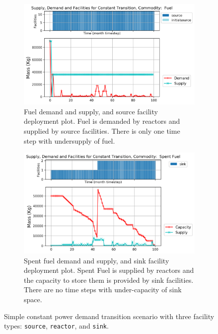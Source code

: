     \begin{figure}[]
        \centering
        \begin{subfigure}[t]{1\textwidth}
            \centering
            \includegraphics[width=0.8\linewidth]{figures/constanttransition-fuel.png} 
            \caption{Fuel demand and supply, and source facility deployment plot.
            Fuel is demanded by reactors and supplied by source facilities.
            There is only one time step with undersupply of fuel.}
            \label{fig:constanttransition-fuel}
        \end{subfigure}
        \begin{subfigure}[t]{1\textwidth}
            \centering
            \includegraphics[width=0.8\linewidth]{figures/constanttransition-spentfuel.png} 
            \caption{Spent fuel demand and supply, and sink facility deployment plot.
                Spent Fuel is supplied by reactors and the capacity to store them 
                is provided by sink facilities.
            There are no time steps with under-capacity of sink space.}
            \label{fig:constanttransition-spentfuel}
        \end{subfigure}
        \caption{Simple constant power demand transition scenario with 
        three facility types: \texttt{source}, \texttt{reactor}, and \texttt{sink}.}
    \end{figure}

